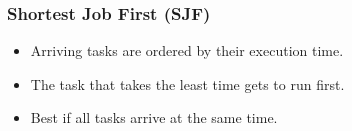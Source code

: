 \begin{frame}

\frametitle{Shortest Job First (SJF)}

\begin{itemize}

\item Arriving tasks are ordered by their execution time.

\item The task that takes the least time gets to run first.

\item Best if all tasks arrive at the same time.

\end{itemize}

\end{frame}
